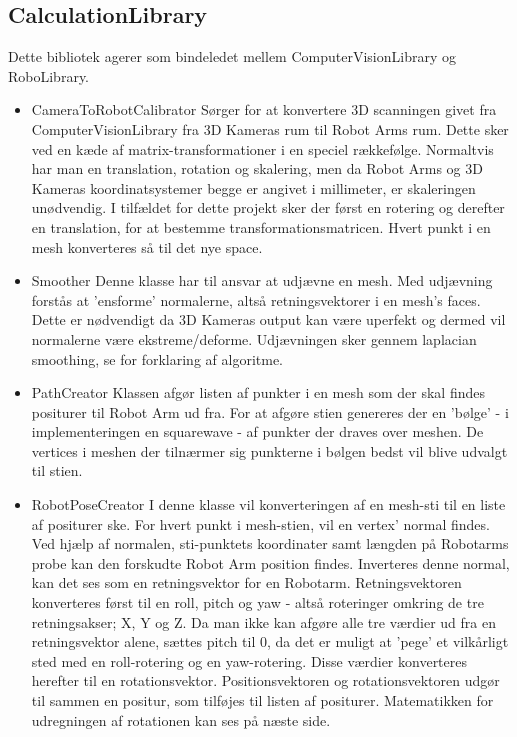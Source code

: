 \subsection{CalculationLibrary}
Dette bibliotek agerer som bindeledet mellem ComputerVisionLibrary og RoboLibrary.

\begin{itemize}
\item{CameraToRobotCalibrator} \newline
Sørger for at konvertere 3D scanningen givet fra ComputerVisionLibrary fra 3D Kameras rum til Robot Arms rum.
Dette sker ved en kæde af matrix-transformationer i en speciel rækkefølge. 
Normaltvis har man en translation, rotation og skalering, men da Robot Arms og 3D Kameras koordinatsystemer begge er angivet i millimeter, er skaleringen unødvendig.
I tilfældet for dette projekt sker der først en rotering og derefter en translation, for at bestemme transformationsmatricen. 
Hvert punkt i en mesh konverteres så til det nye space.

\item{Smoother}\newline
Denne klasse har til ansvar at udjævne en mesh. Med udjævning forstås at 'ensforme' normalerne, altså retningsvektorer i en mesh's faces.
Dette er nødvendigt da 3D Kameras output kan være uperfekt og dermed vil normalerne være ekstreme/deforme. Udjævningen sker gennem laplacian smoothing, se \cite{Smooth} for forklaring af algoritme.

\item{PathCreator}\newline
Klassen afgør listen af punkter i en mesh som der skal findes positurer til Robot Arm ud fra.
For at afgøre stien genereres der en 'bølge' - i implementeringen en squarewave - af punkter der draves over meshen.
De vertices i meshen der tilnærmer sig punkterne i bølgen bedst vil blive udvalgt til stien.

\item{RobotPoseCreator}\newline
I denne klasse vil konverteringen af en mesh-sti til en liste af positurer ske.
For hvert punkt i mesh-stien, vil en vertex' normal findes. 
Ved hjælp af normalen, sti-punktets koordinater samt længden på Robotarms probe kan den forskudte Robot Arm position findes.
Inverteres denne normal, kan det ses som en retningsvektor for en Robotarm.
Retningsvektoren konverteres først til en roll, pitch og yaw - altså roteringer omkring de tre retningsakser; X, Y og Z.
Da man ikke kan afgøre alle tre værdier ud fra en retningsvektor alene, sættes pitch til 0, da det er muligt at 'pege' et vilkårligt sted med en roll-rotering og en yaw-rotering. Disse værdier konverteres herefter til en rotationsvektor.
Positionsvektoren og rotationsvektoren udgør til sammen en positur, som tilføjes til listen af positurer. Matematikken for udregningen af rotationen kan ses på næste side.
\newpage


\end{itemize}
